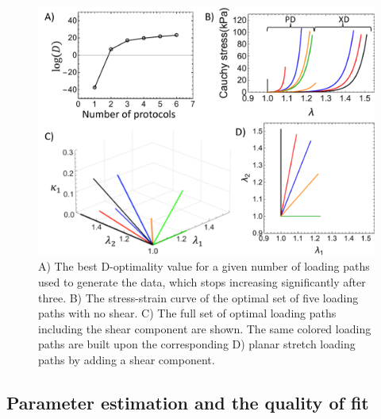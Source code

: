 \begin{figure}[hbtp]
\centering
\includegraphics[width=5.5in]{Images/chapter5/doptimality}
\caption{A) The best D-optimality value for a given number of loading paths used to generate the data, which stops increasing significantly after three. B) The stress-strain curve of the optimal set of five loading paths with no shear. C) The full set of optimal loading paths including the shear component are shown. The same colored loading paths are built upon the corresponding D) planar stretch loading paths by adding a shear component. }
\label{fig:doptimality}
\end{figure} 










\subsection{Parameter estimation and the quality of fit}

